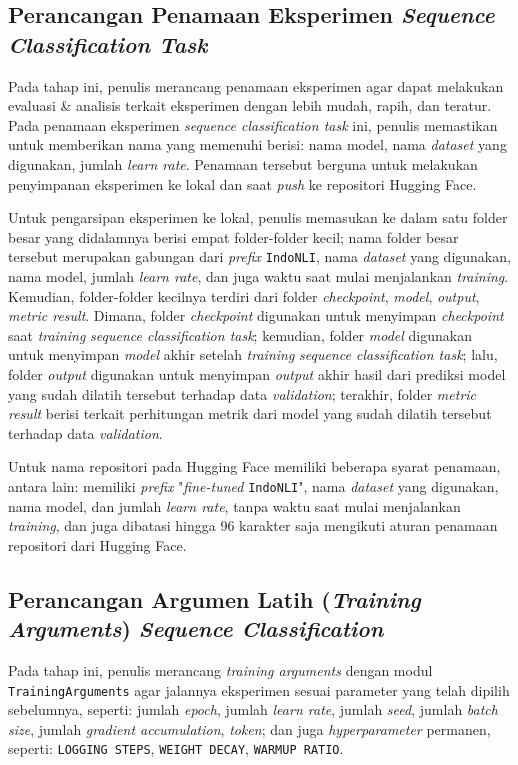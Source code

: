 \subsection{Perancangan Penamaan Eksperimen \emph{Sequence Classification Task}}
Pada tahap ini, penulis merancang penamaan eksperimen agar dapat melakukan evaluasi \& analisis terkait eksperimen dengan lebih mudah, rapih, dan teratur. Pada penamaan eksperimen \emph{sequence classification task} ini, penulis memastikan untuk memberikan nama yang memenuhi berisi: nama model, nama \emph{dataset} yang digunakan, jumlah \emph{learn rate}. Penamaan tersebut berguna untuk melakukan penyimpanan eksperimen ke lokal dan saat \emph{push} ke repositori Hugging Face. 

Untuk pengarsipan eksperimen ke lokal, penulis memasukan ke dalam satu folder besar yang didalamnya berisi empat folder-folder kecil; nama folder besar tersebut merupakan gabungan dari \emph{prefix} \texttt{IndoNLI}, nama \emph{dataset} yang digunakan, nama model, jumlah \emph{learn rate}, dan juga waktu saat mulai menjalankan \emph{training}. Kemudian, folder-folder kecilnya terdiri dari folder \emph{checkpoint}, \emph{model}, \emph{output}, \emph{metric result}. Dimana, folder \emph{checkpoint} digunakan untuk menyimpan \emph{checkpoint} saat \emph{training} \emph{sequence classification task}; kemudian, folder \emph{model} digunakan untuk menyimpan \emph{model} akhir setelah \emph{training} \emph{sequence classification task}; lalu, folder \emph{output} digunakan untuk menyimpan \emph{output} akhir hasil dari prediksi model yang sudah dilatih tersebut terhadap data \emph{validation}; terakhir, folder \emph{metric result} berisi terkait perhitungan metrik dari model yang sudah dilatih tersebut terhadap data \emph{validation}.

Untuk nama repositori pada Hugging Face memiliki beberapa syarat penamaan, antara lain: memiliki \emph{prefix} "\emph{fine-tuned} \texttt{IndoNLI}", nama \emph{dataset} yang digunakan, nama model, dan jumlah \emph{learn rate}, tanpa waktu saat mulai menjalankan \emph{training}, dan juga dibatasi hingga 96 karakter saja mengikuti aturan penamaan repositori dari Hugging Face.

\subsection{Perancangan Argumen Latih (\emph{Training Arguments}) \emph{Sequence Classification}}
Pada tahap ini, penulis merancang \emph{training arguments} dengan modul \texttt{TrainingArguments} agar jalannya eksperimen sesuai parameter yang telah dipilih sebelumnya, seperti: jumlah \emph{epoch}, jumlah \emph{learn rate}, jumlah \emph{seed}, jumlah \emph{batch size}, jumlah \emph{gradient accumulation}, \emph{token}; dan juga \emph{hyperparameter} permanen, seperti:  \texttt{LOGGING STEPS}, \texttt{WEIGHT DECAY}, \texttt{WARMUP RATIO}. 

